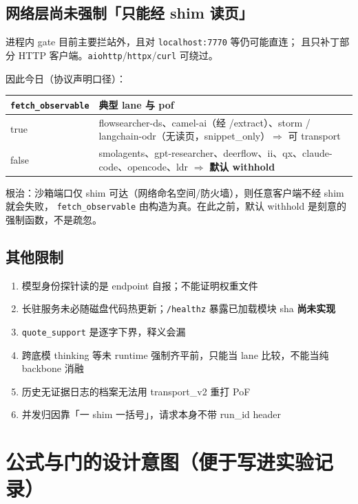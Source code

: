 \documentclass[10.5pt,a4paper]{article}
\begin{document}
\subsection{网络层尚未强制「只能经 shim 读页」}

进程内 gate 目前主要拦站外，且对 \texttt{localhost:7770} 等仍可能直连；
且只补丁部分 HTTP 客户端。\texttt{aiohttp}/\texttt{httpx}/\texttt{curl} 可绕过。

因此今日（协议声明口径）：
\begin{center}
\begin{tabularx}{\textwidth}{@{}lX@{}}
\toprule
\texttt{fetch\_observable} & 典型 lane 与 pof \\
\midrule
true & flowsearcher-ds、camel-ai（经 /extract）、storm / langchain-odr（无读页，snippet\_only）$\Rightarrow$ 可 transport \\
false & smolagents、gpt-researcher、deerflow、ii、qx、claude-code、opencode、ldr $\Rightarrow$ \textbf{默认 withhold} \\
\bottomrule
\end{tabularx}
\end{center}

根治：沙箱端口仅 shim 可达（网络命名空间/防火墙），则任意客户端不经 shim 就会失败，
\texttt{fetch\_observable} 由构造为真。在此之前，默认 withhold 是刻意的强制函数，不是疏忽。

\subsection{其他限制}

\begin{enumerate}
  \item 模型身份探针读的是 endpoint 自报；不能证明权重文件
  \item 长驻服务未必随磁盘代码热更新；\texttt{/healthz} 暴露已加载模块 sha \textbf{尚未实现}
  \item \texttt{quote\_support} 是逐字下界，释义会漏
  \item 跨底模 thinking 等未 runtime 强制齐平前，只能当 lane 比较，不能当纯 backbone 消融
  \item 历史无证据日志的档案无法用 transport\_v2 重打 PoF
  \item 并发归因靠「一 shim 一括号」，请求本身不带 run\_id header
\end{enumerate}

\section{公式与门的设计意图（便于写进实验记录）}
\end{document}
